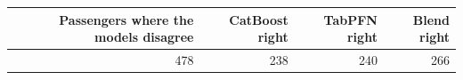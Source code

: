 \begin{tabular}{rrrr}
\toprule
Passengers where the models disagree & CatBoost right & TabPFN right & Blend right \\
\midrule
478 & 238 & 240 & 266 \\
\bottomrule
\end{tabular}
